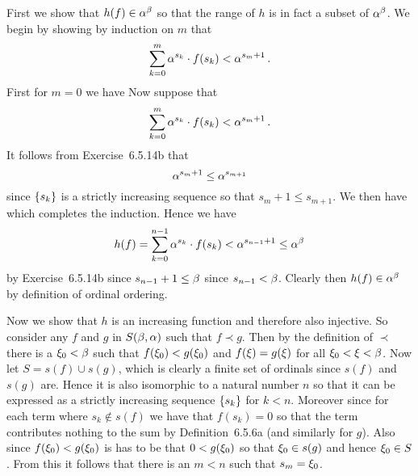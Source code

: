 \begin{solution}
    First we show that $h(f) \in \alpha^\beta$ so that the range of $h$ is in fact a subset of $\alpha^\beta$.
    We begin by showing by induction on $m$ that
    $$
    \sum_{k=0}^m \alpha^{s_k} \cdot f(s_k) < \alpha^{s_m + 1}  \,.
    $$
    First for $m=0$ we have
    Now suppose that
    $$
    \sum_{k=0}^m \alpha^{s_k} \cdot f(s_k) < \alpha^{s_m + 1} \,.
    $$
    It follows from Exercise~6.5.14b that
    $$
    \alpha^{s_m + 1} \leq \alpha^{s_{m+1}}
    $$
    since $\left\{ s_k \right\}$ is a strictly increasing sequence so that $s_m + 1 \leq s_{m+1}$.
    We then have
    which completes the induction.
    Hence we have
    $$
    h(f) = \sum_{k=0}^{n-1} \alpha^{s_k} \cdot f(s_k) < \alpha^{s_{n-1} + 1} \leq \alpha^\beta
    $$
    by Exercise~6.5.14b since $s_{n-1} + 1 \leq \beta$ since $s_{n-1} < \beta$.
    Clearly then $h(f) \in \alpha^\beta$ by definition of ordinal ordering.

    Now we show that $h$ is an increasing function and therefore also injective.
    So consider any $f$ and $g$ in $S(\beta, \alpha)$ such that $f \prec g$.
    Then by the definition of $\prec$ there is a $\xi_0 < \beta$ such that $f(\xi_0) < g(\xi_0)$ and $f(\xi) = g(\xi)$ for all $\xi_0 < \xi < \beta$.
    Now let $S = s(f) \cup  s(g)$, which is clearly a finite set of ordinals since $s(f)$ and $s(g)$ are.
    Hence it is also isomorphic to a natural number $n$ so that it can be expressed as a strictly increasing sequence $\left\{ s_k \right\}$ for $k < n$.
    Moreover
    since for each term where $s_k \notin s(f)$ we have that $f(s_k) = 0$ so that the term contributes nothing to the sum by Definition~6.5.6a (and similarly for $g$).
    Also since $f(\xi_0) < g(\xi_0)$ is has to be that $0 < g(\xi_0)$ so that $\xi_0 \in s(g)$ and hence $\xi_0 \in S$.
    From this it follows that there is an $m < n$ such that $s_m = \xi_0$.


\end{solution}
